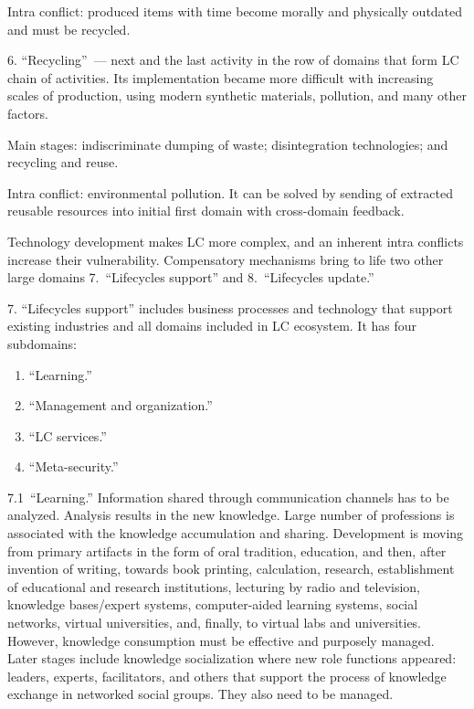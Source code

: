 \begin{multicols}{2}
  Intra conflict: produced items with time become morally and physically outdated and must be recycled.

 6. ``Recycling''~--- next and the last activity in the row of domains that form LC chain of activities. Its
implementation became more difficult with increasing scales of production, using modern synthetic
materials, pollution, and many other factors.

 Main stages: indiscriminate dumping of waste; disintegration technologies;
 and recycling and reuse.

 Intra conflict: environmental pollution. It can be solved by sending of extracted reusable resources  into
initial first domain with  cross-domain feedback.

 Technology development makes LC more complex, and an inherent intra conflicts increase their
vulnerability. Compensatory mechanisms bring to life two other large domains
 7.~``Lifecycles support'' and 8.~``Lifecycles update.''

 7. ``Lifecycles support'' includes business processes and technology that support existing industries and
all domains included in LC ecosystem. It has four subdomains:
 \begin{enumerate}[{7}.1]
 \item ``Learning.''
 \item  ``Management and organization.''
 \item ``LC services.''
 \item  ``Meta-security.''
 \end{enumerate}

 7.1\ ``Learning.'' Information shared through communication channels has to be analyzed. Analysis results
in the new knowledge. Large number of professions is associated with the knowledge accumulation and
sharing. Development is moving from primary artifacts in the form of oral tradition, education, and then,
after invention of writing, towards book printing, calculation, research, establishment of educational and
research institutions, lecturing by radio and television, knowledge bases/expert systems,
computer-aided
learning systems, social networks, virtual universities, and, finally,
to virtual labs and universities. However,
knowledge consumption must be effective and purposely managed. Later stages include knowledge
socialization where new role functions appeared:  leaders, experts, facilitators, and others that support
the process of knowledge exchange in networked social groups. They also need to be managed.


\end{multicols}
